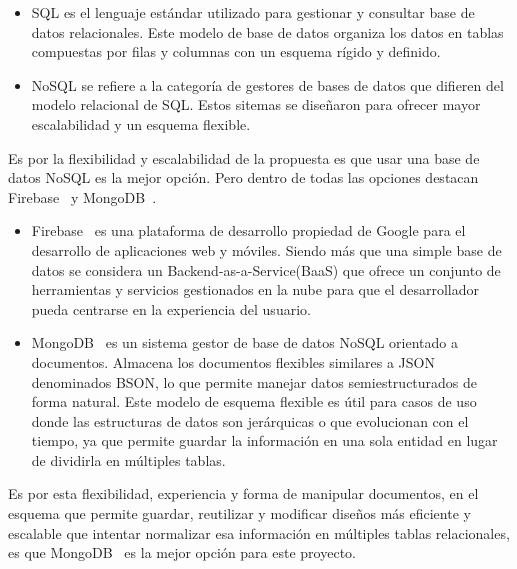 ﻿\documentclass{iccmemoria}
\begin{document}
    \begin{itemize}
        \item SQL es el lenguaje estándar utilizado para gestionar y consultar base de datos relacionales. Este modelo de base de datos organiza los datos en tablas compuestas por filas y columnas con un esquema rígido y definido.

        \item NoSQL se refiere a la categoría de gestores de bases de datos que difieren del modelo relacional de SQL. Estos sitemas se diseñaron para ofrecer mayor escalabilidad y un esquema flexible.
    \end{itemize}
    Es por la flexibilidad y escalabilidad de la propuesta es que usar una base de datos NoSQL es la mejor opción. Pero dentro de todas las opciones destacan Firebase~\cite{firebase} y MongoDB~\cite{mongodb}.\\

    \begin{itemize}
        \item Firebase~\cite{firebase} es una plataforma de desarrollo propiedad de Google para el desarrollo de aplicaciones web y móviles. Siendo más que una simple base de datos se considera un Backend-as-a-Service(BaaS) que ofrece un conjunto de herramientas y servicios gestionados en la nube para que el desarrollador pueda centrarse en la experiencia del usuario. 

        \item MongoDB~\cite{mongodb} es un sistema gestor de base de datos NoSQL orientado a documentos. Almacena los documentos flexibles similares a JSON denominados BSON, lo que permite manejar datos semiestructurados de forma natural. Este modelo de esquema flexible es útil para casos de uso donde las estructuras de datos son jerárquicas o que evolucionan con el tiempo, ya que permite guardar la información en una sola entidad en lugar de dividirla en múltiples tablas.
    \end{itemize}
    Es por esta flexibilidad, experiencia y forma de manipular documentos, en el esquema que permite guardar, reutilizar y modificar diseños más eficiente y escalable que intentar normalizar esa información en múltiples tablas relacionales, es que MongoDB~\cite{mongodb} es la mejor opción para este proyecto.
\end{document}
